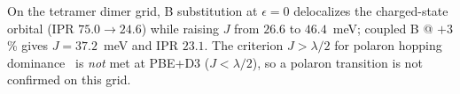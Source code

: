 
On the tetramer dimer grid, B substitution at $\epsilon{=}0$ delocalizes the charged-state orbital (IPR $75.0\rightarrow 24.6$) while raising $J$ from $26.6$ to $46.4$~meV; coupled B @ $+3$\% gives $J=37.2$~meV and IPR $23.1$.
The criterion $J>\lambda/2$ for polaron hopping dominance~\cite{Capobianco2024electron} is \emph{not} met at PBE+D3 ($J<\lambda/2$), so a polaron transition is not confirmed on this grid.
